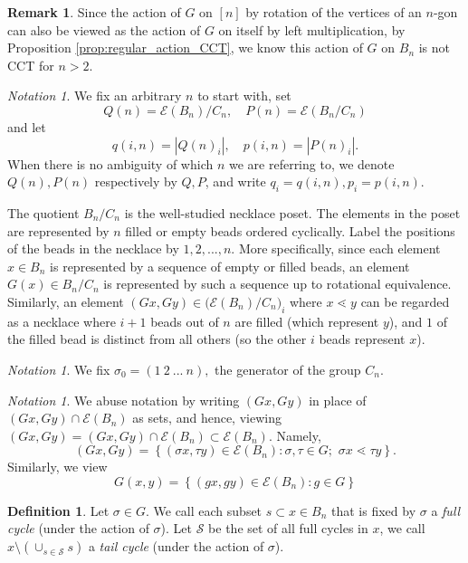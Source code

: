 \documentclass[10 pt]{amsart}
\theoremstyle{plain}
\theoremstyle{definition}
\newtheorem{defn}[thm]{Definition}
\newtheorem{rem}[thm]{Remark}
\theoremstyle{remark}
\newtheorem{note}[thm]{Notation}
\numberwithin{equation}{section}
\begin{document}
\begin{rem}
Since the action of $G$ on $[n]$ by rotation of the vertices of an $n$-gon can also be viewed as the action of $G$ on itself by left multiplication, by Proposition \ref{prop:regular_action_CCT}, we know this action of $G$ on $B_n$ is not CCT for $n > 2.$
\end{rem}


\begin{note} We fix an arbitrary $n$ to start with,  set $$Q(n) =  \mathcal E (B_n)/C_{n}, \quad P(n) =  \mathcal E(B_n/C_{n})$$ and let $$q (i, n) =|Q(n)_i|, \quad p (i, n) =|P(n)_i|. $$  When there is no ambiguity of which $n$ we are referring to, we denote $Q(n), P(n)$ respectively by $Q, P$, and write $q_i = q(i, n), p_i = p (i, n)$.
\end{note}

The quotient $B_n /C_n$ is the well-studied necklace poset. The elements in the poset are represented by $n$ filled or empty beads ordered cyclically. Label the positions of the beads in the necklace by $1, 2, ..., n$. More specifically, since each element $x \in B_n$ is represented by a sequence of empty or filled beads, an element $G(x) \in B_n/C_n$ is represented by such a sequence up to rotational equivalence.  Similarly, an element $(Gx, Gy) \in \big( \mathcal E(B_n)/C_n\big)_{i}$ where $x \lessdot y$ can be regarded as a necklace where $i+1$ beads out of $n$ are filled (which represent $y$), and $1$ of the filled bead is distinct from all others (so the other $i$ beads represent $x$).
 
\begin{note}
We fix $\sigma_0 = (1 \: 2 \: ... \: n),$ the generator of the group $C_n$.
\end{note}


\begin{note}
We abuse notation by writing $(Gx, Gy)$ in place of $(Gx, Gy) \cap  \mathcal E(B_n)$ as sets, and hence, viewing $(Gx, Gy) = (Gx, Gy) \cap  \mathcal E(B_n)\subset  \mathcal E(B_n).$ Namely, $$(Gx, Gy) = \left\{ (\sigma x, \tau y) \in  \mathcal E (B_n) : \sigma, \tau \in G; \, \, \sigma x \lessdot \tau y  \right\}.$$ Similarly, we view $$G(x, y) = \left\{ (gx , g y) \in  \mathcal E (B_n) : g \in G \right\} $$
\end{note}

\begin{defn}
Let  $\sigma \in G.$ We call each subset $s \subset x \in B_n$ that is fixed by $\sigma$ a \textit{full cycle} (under the action of $\sigma$). Let $\mathcal S$ be the set of all full cycles in $x$, we call   $ x \setminus \left(\cup_{s \in \mathcal S}  s \right)$ a \textit{tail cycle} (under the action of $\sigma$).  
\end{defn}
\end{document}
